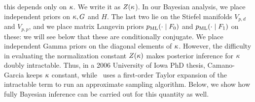 this depends only on $\kappa$. We write it as $Z(\kappa$).
In our Bayesian analysis, we place independent priors on 
$\kappa, G$ and $H$.
The last two lie on the Stiefel manifolds $V_{p,d}$ and $V_{p,p}$, and we place matrix Langevin priors $\ml(\cdot\mid F_0)$ and $\ml(\cdot\mid F_1)$ on 
these: we will see below that these are conditionally conjugate. %
We place independent {Gamma} priors on the diagonal elements of $\kappa$. %
However, the difficulty in evaluating the normalization constant $Z(\kappa)$ 
makes posterior inference for $\kappa$ doubly intractable.  Thus, in a 2006 University of Iowa PhD thesis, Camano-Garcia %
keeps $\kappa$ constant, while~\cite{hoff2009jrssb} uses a first-order Taylor expansion of the intractable term to run an approximate sampling algorithm.
Below, we show how fully Bayesian inference can be carried out for this quantity as well.

